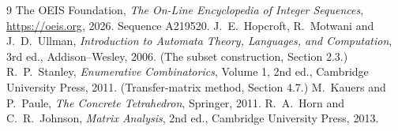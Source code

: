\documentclass[11pt,a4paper]{article}
\theoremstyle{plain}
\theoremstyle{definition}
\begin{document}
\begin{thebibliography}{9}
 The OEIS Foundation, \emph{The On-Line Encyclopedia of Integer
Sequences}, \url{https://oeis.org}, 2026. Sequence A219520.
 J.~E.~Hopcroft, R.~Motwani and J.~D.~Ullman, \emph{Introduction to Automata
Theory, Languages, and Computation}, 3rd ed., Addison--Wesley, 2006. (The subset
construction, Section 2.3.)
 R.~P.~Stanley, \emph{Enumerative Combinatorics}, Volume 1, 2nd ed.,
Cambridge University Press, 2011. (Transfer-matrix method, Section 4.7.)
 M.~Kauers and P.~Paule, \emph{The Concrete Tetrahedron}, Springer, 2011.
 R.~A.~Horn and C.~R.~Johnson, \emph{Matrix Analysis}, 2nd ed., Cambridge
University Press, 2013.
\end{thebibliography}
\end{document}
